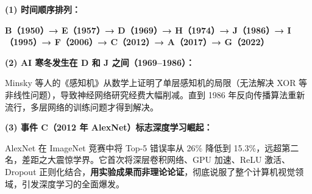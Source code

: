 \documentclass[a4paper,11pt]{ctexart}
\begin{document}
\begin{solutionbox}[参考答案与详细解析]
    \textbf{(1) 时间顺序排列：}

    \textbf{B（1950）→ E（1957）→ D（1969）→ H（1974）→ J（1986）→ I（1995）→ F（2006）→ C（2012）→ A（2017）→ G（2022）}

    \textbf{(2) AI 寒冬发生在 D 和 J 之间（1969--1986）：}

    Minsky 等人的《感知机》从数学上证明了单层感知机的局限（无法解决 XOR 等非线性问题），导致神经网络研究经费大幅削减。直到 1986 年反向传播算法重新流行，多层网络的训练问题才得到解决。

    \textbf{(3) 事件 C（2012 年 AlexNet）标志深度学习崛起：}

    AlexNet 在 ImageNet 竞赛中将 Top-5 错误率从 26\% 降低到 15.3\%，远超第二名，差距之大震惊学界。它首次将深层卷积网络、GPU 加速、ReLU 激活、Dropout 正则化结合，\textbf{用实验成果而非理论论证}，彻底说服了整个计算机视觉领域，引发深度学习的全面爆发。
\end{solutionbox}
\end{document}
